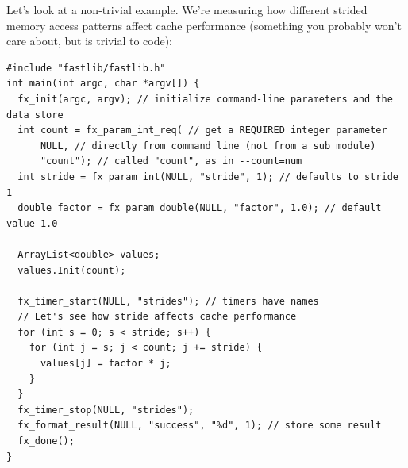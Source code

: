 \documentclass[letter]{report}
\begin{document}
Let's look at a non-trivial example. We're measuring how different strided memory access patterns affect cache performance (something you probably won't care about, but is trivial to code):
\begin{verbatim}
#include "fastlib/fastlib.h"
int main(int argc, char *argv[]) {
  fx_init(argc, argv); // initialize command-line parameters and the data store
  int count = fx_param_int_req( // get a REQUIRED integer parameter
      NULL, // directly from command line (not from a sub module)
      "count"); // called "count", as in --count=num
  int stride = fx_param_int(NULL, "stride", 1); // defaults to stride 1
  double factor = fx_param_double(NULL, "factor", 1.0); // default value 1.0
  
  ArrayList<double> values;
  values.Init(count);

  fx_timer_start(NULL, "strides"); // timers have names
  // Let's see how stride affects cache performance
  for (int s = 0; s < stride; s++) {
    for (int j = s; j < count; j += stride) {
      values[j] = factor * j;
    }
  }
  fx_timer_stop(NULL, "strides");
  fx_format_result(NULL, "success", "%d", 1); // store some result
  fx_done();
}
\end{verbatim}
\end{document}
